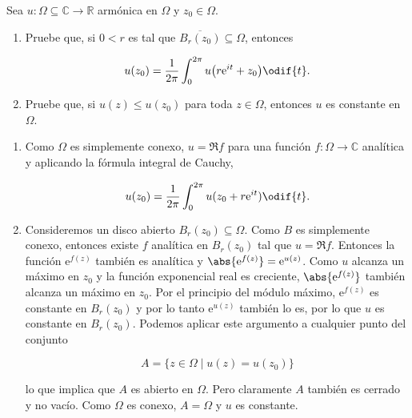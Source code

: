 \documentclass[../main.tex]{subfiles}
\begin{document}
\begin{problema}
    Sea \(u \colon \Omega \subseteq \mathbb{C} \to \mathbb{R}\) armónica en \(\Omega\) y
    \(z_{0}\in \Omega\).

    \begin{enumerate}
        \item Pruebe que, si \(0 < r\) es tal que \(\overline{B_{r}(z_{0})} \subseteq
            \Omega\), entonces

            \begin{equation*}
                u(z_{0}) = \dfrac{1}{2\pi}\int_{0}^{2\pi}u \bigl(r \mathrm{e}^{it} +
                z_{0}\bigr)\odif{t}.
            \end{equation*}

        \item Pruebe que, si \(u(z) \leq u(z_{0})\) para toda \(z\in
            \Omega\), entonces \(u\) es
            constante en \(\Omega\).
    \end{enumerate}
\end{problema}

\startsolution

\begin{enumerate}
    \item Como \(\Omega\) es simplemente conexo, \(u = \Re f\) para una función \(f
        \colon \Omega \to \mathbb{C}\) analítica y aplicando la fórmula
        integral de Cauchy,

        \begin{equation*}
            u(z_{0}) = \dfrac{1}{2\pi}\int_{0}^{2\pi}u(z_{0} + r
            \mathrm{e}^{it})\odif{t}.
        \end{equation*}

    \item Consideremos un disco abierto \(B_{r}(z_{0}) \subseteq \Omega\). Como \(B\) es
        simplemente conexo, entonces existe \(f\) analítica en
        \(B_{r}(z_{0})\) tal que \(u = \Re f\).
        Entonces la función \(\mathrm{e}^{f(z)}\) también es analítica y
        \(\abs{\mathrm{e}^{f(z)}} = \mathrm{e}^{u(z)}\). Como \(u\) alcanza un máximo en
        \(z_{0}\) y la función exponencial real es creciente,
        \(\abs{\mathrm{e}^{f(z)}}\)
        también alcanza un máximo en \(z_{0}\). Por el principio del módulo máximo,
        \(\mathrm{e}^{f(z)}\) es constante en \(B_{r}(z_{0})\) y por lo tanto
        \(\mathrm{e}^{u(z)}\)
        también lo es, por lo que \(u\) es constante en \(B_{r}(z_{0})\).
        Podemos aplicar este
        argumento a cualquier punto del conjunto

        \begin{equation*}
            A = \bigl\lbrace z\in \Omega \mid u(z) = u(z_{0})\bigr\rbrace
        \end{equation*}

        lo que implica que \(A\) es abierto en \(\Omega\). Pero claramente
        \(A\) también es
        cerrado y no vacío. Como \(\Omega\) es conexo, \(A = \Omega\)  y
        \(u\) es constante.
\end{enumerate}
\end{document}
